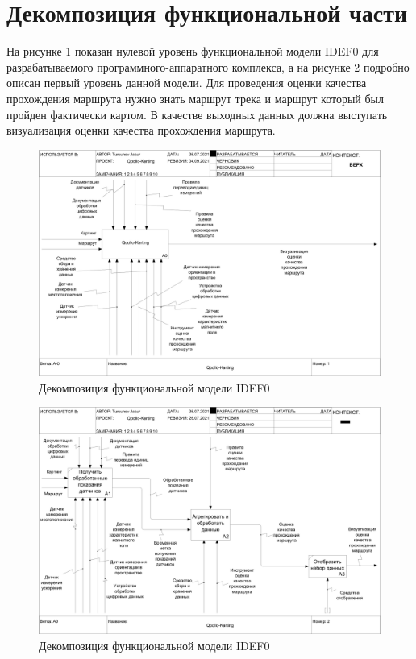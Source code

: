 \documentclass[a4paper, 10pt]{article}
\begin{document}
	\section{Декомпозиция функциональной части}
	На рисунке 1 показан нулевой уровень функциональной модели IDEF0 для разрабатываемого программного-аппаратного комплекса, а на рисунке 2 подробно описан первый уровень данной модели. Для проведения оценки качества прохождения маршрута нужно знать маршрут трека и маршрут который был пройден фактически картом. В качестве выходных данных должна выступать визуализация оценки качества прохождения маршрута.
	\begin{figure}[h!]
		\centering
		\includegraphics[scale=0.22]{idef0}
		\centering\caption{Декомпозиция функциональной модели IDEF0}
	\end{figure}
	\begin{figure}[h!]
		\centering
		\includegraphics[scale=0.22]{idef1}
		\centering\caption{Декомпозиция функциональной модели IDEF0}
	\end{figure}
\end{document}
